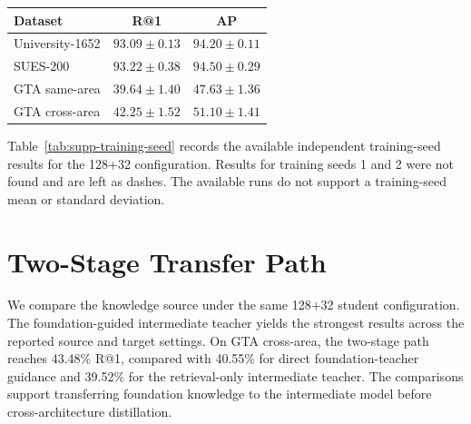 \par\medskip\noindent\begin{minipage}{\columnwidth}
\captionsetup{type=table}
\centering
\caption{Mean and sample standard deviation across the five projection bases. Values are percentages.}
\label{tab:supp-random-summary}
{\footnotesize\setlength{\tabcolsep}{2pt}\renewcommand{\arraystretch}{1.08}
\begin{tabular*}{\columnwidth}{@{\extracolsep{\fill}}lcc@{}}
\toprule
Dataset & R@1 & AP \\
\midrule
University-1652 & $93.09\pm0.13$ & $94.20\pm0.11$ \\
SUES-200 & $93.22\pm0.38$ & $94.50\pm0.29$ \\
GTA same-area & $39.64\pm1.40$ & $47.63\pm1.36$ \\
GTA cross-area & $42.25\pm1.52$ & $51.10\pm1.41$ \\
\bottomrule
\end{tabular*}}
\end{minipage}\par\medskip

\par\medskip\noindent\begin{minipage}{\columnwidth}
\captionsetup{type=table}
\centering
\caption{Training-seed results for the 128+32 student. Cells report D$\rightarrow$S R@1/AP (\%). Dashes indicate unavailable results.}
\label{tab:supp-training-seed}
{\footnotesize\setlength{\tabcolsep}{2pt}\renewcommand{\arraystretch}{1.08}
}
\end{minipage}\par\medskip

Table~\ref{tab:supp-training-seed} records the available independent training-seed results for the 128+32 configuration. Results for training seeds 1 and 2 were not found and are left as dashes. The available runs do not support a training-seed mean or standard deviation.


\section{Two-Stage Transfer Path}
\label{sec:supp-objectives}
We compare the knowledge source under the same 128+32 student configuration. The foundation-guided intermediate teacher yields the strongest results across the reported source and target settings. On GTA cross-area, the two-stage path reaches 43.48\% R@1, compared with 40.55\% for direct foundation-teacher guidance and 39.52\% for the retrieval-only intermediate teacher. The comparisons support transferring foundation knowledge to the intermediate model before cross-architecture distillation.

